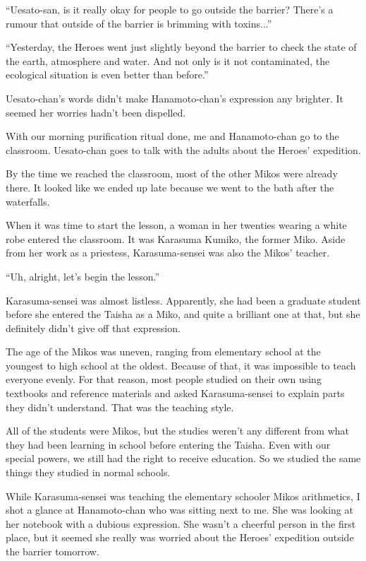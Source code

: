 ``Uesato-san, is it really okay for people to go outside the barrier? There's a rumour that outside of the barrier is brimming with toxins...''

``Yesterday, the Heroes went just slightly beyond the barrier to check the state of the earth, atmosphere and water. And not only is it not contaminated, the ecological situation is even better than before.''

Uesato-chan's words didn't make Hanamoto-chan's expression any brighter. It seemed her worries hadn't been dispelled.

With our morning purification ritual done, me and Hanamoto-chan go to the classroom. Uesato-chan goes to talk with the adults about the Heroes' expedition.

By the time we reached the classroom, most of the other Mikos were already there. It looked like we ended up late because we went to the bath after the waterfalls.

When it was time to start the lesson, a woman in her twenties wearing a white robe entered the classroom. It was Karasuma Kumiko, the former Miko. Aside from her work as a priestess, Karasuma-sensei was also the Mikos' teacher.

``Uh, alright, let's begin the lesson.''

Karasuma-sensei was almost listless. Apparently, she had been a graduate student before she entered the Taisha as a Miko, and quite a brilliant one at that, but she definitely didn't give off that expression.

The age of the Mikos was uneven, ranging from elementary school at the youngest to high school at the oldest. Because of that, it was impossible to teach everyone evenly. For that reason, most people studied on their own using textbooks and reference materials and asked Karasuma-sensei to explain parts they didn't understand. That was the teaching style.

All of the students were Mikos, but the studies weren't any different from what they had been learning in school before entering the Taisha. Even with our special powers, we still had the right to receive education. So we studied the same things they studied in normal schools.

While Karasuma-sensei was teaching the elementary schooler Mikos arithmetics, I shot a glance at Hanamoto-chan who was sitting next to me. She was looking at her notebook with a dubious expression. She wasn't a cheerful person in the first place, but it seemed she really was worried about the Heroes' expedition outside the barrier tomorrow.

